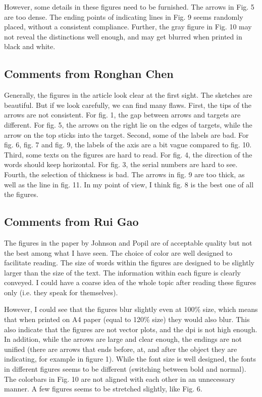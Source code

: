 \documentclass[paper=a4, fontsize=11pt]{scrartcl} %
\numberwithin{equation}{section} %
\numberwithin{figure}{section} %
\numberwithin{table}{section} %
\begin{document}
		However, some details in these figures need to be furnished. The arrows in Fig. 5 are too dense. The ending points of indicating lines in Fig. 9 seems randomly placed, without a consistent compliance. Further, the gray figure in Fig. 10 may not reveal the distinctions well enough, and may get blurred when printed in black and white.
		
	\subsection{Comments from Ronghan Chen}
		Generally, the figures in the article look clear at the first sight. The sketches are beautiful. But if we look carefully, we can find many flaws. First, the tips of the arrows are not consistent. For fig. 1, the gap between arrows and targets are different. For fig. 5, the arrows on the right lie on the edges of targets, while the arrow on the top sticks into the target. Second, some of the labels are bad. For fig. 6, fig. 7 and fig. 9, the labels of the axis are a bit vague compared to fig. 10. Third, some texts on the figures are hard to read. For fig. 4, the direction of the words should keep horizontal. For fig. 3, the serial numbers are hard to see. Fourth, the selection of thickness is bad. The arrows in fig. 9 are too thick, as well as the line in fig. 11. In my point of view, I think fig. 8 is the best one of all the figures.
	
	\subsection{Comments from Rui Gao}
		The figures in the paper by Johnson and Popil are of acceptable quality but not the best among what I have seen. The choice of color are well designed to facilitate reading. The size of words within the figures are designed to be slightly larger than the size of the text. The information within each figure is clearly conveyed. I could have a coarse idea of the whole topic after reading these figures only (i.e. they speak for themselves).\newline
		
		However, I could see that the figures blur slightly even at 100\% size, which means that when printed on A4 paper (equal to 120\% size) they would also blur. This also indicate that the figures are not vector plots, and the dpi is not high enough. In addition, while the arrows are large and clear enough, the endings are not unified (there are arrows that ends before, at, and after the object they are indicating, for example in figure 1). While the font size is well designed, the fonts in different figures seems to be different (switching between bold and normal). The colorbars in Fig. 10 are not aligned with each other in an unnecessary manner. A few figures seems to be stretched slightly, like Fig. 6.
		
\end{document}
